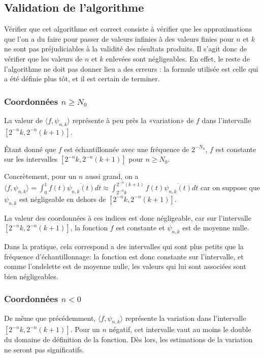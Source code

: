 \documentclass[]{article}
\theoremstyle{remark}
\theoremstyle{definition}
\begin{document}
\subsection{Validation de l'algorithme}

Vérifier que cet algorithme est correct consiste à vérifier que les approximations que l'on a du faire pour passer de valeurs infinies à des valeurs finies pour $n$ et $k$ ne sont pas préjudiciables à la validité des résultats produits. Il s'agit donc de vérifier que les valeurs de $n$ et $k$ enlevées sont négligeables. En effet,  le reste de l'algorithme ne doit pas donner lieu a des erreurs : la formule utilisée est celle qui a été définie plus tôt, et il est certain de terminer. 

\subsubsection{Coordonnées $n\geqslant N_0$}

La valeur de $\langle f,\psi_{n,k}\rangle$ représente à peu près la «variation» de $f$ dans l'intervalle $[2^{-n}k,2^{-n}(k+1)]$.

Étant donné que $f$ est échantillonnée avec une fréquence de $2^{-N_0}$, $f$ est constante sur les intervalles $[2^{-n}k,2^{-n}(k+1)]$ pour $n\geqslant N_0$.

Concrètement, pour un $n$ aussi grand, on a $\langle f,\psi_{n,k}\rangle = \int_0^1 f(t) \overline{\psi_{n, k}(t)}dt \approx \int_{2^{-n}k}^{2^{-n}(k+1)} f(t) \overline{\psi_{n, k}(t)}dt$ car on suppose que $\psi_{n,k}$ est négligeable en dehors de $[2^{-n}k,2^{-n}(k+1)]$.

La valeur des coordonnées à ces indices est donc négligeable, car sur l'intervalle $[2^{-n}k,2^{-n}(k+1)]$, la fonction $f$ est constante et $\psi_{n,k}$ est de moyenne nulle.

Dans la pratique, cela correspond a des intervalles qui sont plus petits que la fréquence d'échantillonnage: la fonction est donc constante sur l'intervalle, et comme l'ondelette est de moyenne nulle, les valeurs qui lui sont associées sont bien négligeables. 


\subsubsection{Coordonnées $n < 0$}

De même que précédemment, $\langle f,\psi_{n,k}\rangle$ représente la variation dans l'intervalle $[2^{-n}k,2^{-n}(k+1)]$. Pour un $n$ négatif, cet intervalle vaut au moins le double du domaine de définition de la fonction. Dès lors, les estimations de la variation ne seront pas significatifs.
\end{document}
